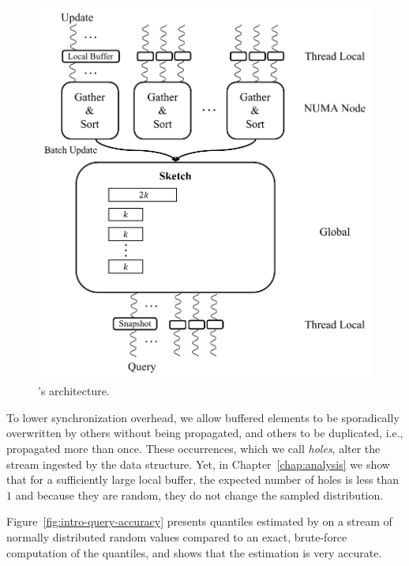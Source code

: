 \begin{figure}[htp]
    \centering
    \hspace{70pt}
        \includegraphics[width=0.8\linewidth,trim={0cm 0cm 0cm 0.1cm},clip]{graphics/algorithm/architecture.pdf}
    \caption{\mysketch's architecture.}
    \label{fig:quancurrentDS}
\end{figure}


To lower synchronization overhead, we allow buffered elements to be sporadically overwritten by others without being propagated, and others to be duplicated, i.e., propagated more than once. These occurrences, which we call \emph{holes}, alter the stream ingested by the data structure. 
Yet, in Chapter~\ref{chap:analysis} we show that for a sufficiently large local buffer, the expected number of holes is less than $1$ and because they are random, they do not change the sampled distribution.


Figure~\ref{fig:intro-query-accuracy} presents quantiles estimated by \mysketch on a stream of normally distributed random values compared to an exact, brute-force computation of the quantiles, and shows that the estimation is very accurate.

